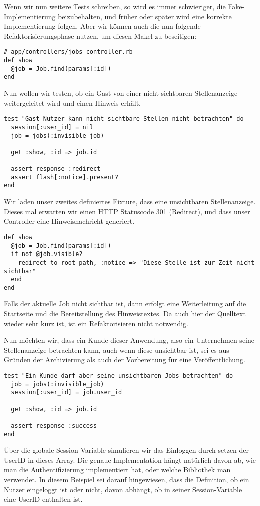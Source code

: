 Wenn wir nun weitere Tests schreiben, so wird es immer schwieriger, die Fake-Implementierung beizubehalten, und früher oder später wird eine korrekte Implementierung folgen. 
Aber wir können auch die nun folgende Refaktorisierungsphase nutzen, um diesen Makel zu beseitigen:
\tddrefactor
\begin{lstlisting}
# app/controllers/jobs_controller.rb
def show
  @job = Job.find(params[:id])
end
\end{lstlisting}

Nun wollen wir testen, ob ein Gast von einer nicht-sichtbaren Stellenanzeige weitergeleitet wird und einen Hinweis erhält.

\begin{lstlisting}
test "Gast Nutzer kann nicht-sichtbare Stellen nicht betrachten" do
  session[:user_id] = nil
  job = jobs(:invisible_job)
  
  get :show, :id => job.id

  assert_response :redirect
  assert flash[:notice].present?
end
\end{lstlisting}
\tddred

Wir laden unser zweites definiertes Fixture, dass eine unsichtbaren Stellenanzeige. Dieses mal erwarten wir einen HTTP Statuscode 301 (Redirect), und dass unser Controller eine Hinweisnachricht generiert.

\begin{lstlisting}
def show
  @job = Job.find(params[:id])
  if not @job.visible?
    redirect_to root_path, :notice => "Diese Stelle ist zur Zeit nicht sichtbar"
  end
end
\end{lstlisting}
\tddgreen
Falls der aktuelle Job nicht sichtbar ist, dann erfolgt eine Weiterleitung auf die Startseite und die Bereitstellung des Hinweistextes.
\tddrefactor
Da auch hier der Quelltext wieder sehr kurz ist, ist ein Refaktorisieren nicht notwendig.

Nun möchten wir, dass ein Kunde dieser Anwendung, also ein Unternehmen seine Stellenanzeige betrachten kann, auch wenn diese unsichtbar ist, sei es aus Gründen der Archivierung als auch der Vorbereitung für eine Veröffentlichung.

\begin{lstlisting}
test "Ein Kunde darf aber seine unsichtbaren Jobs betrachten" do
  job = jobs(:invisible_job)
  session[:user_id] = job.user_id
  
  get :show, :id => job.id

  assert_response :success
end
\end{lstlisting}
\tddred
Über die globale Session Variable simulieren wir das Einloggen durch setzen der UserID in dieses Array. Die genaue Implementation hängt natürlich davon ab, wie man die Authentifizierung implementiert hat, oder welche Bibliothek man verwendet. In diesem Beispiel sei darauf hingewiesen, dass die Definition, ob ein Nutzer eingeloggt ist oder nicht, davon abhängt, ob in seiner Session-Variable eine UserID enthalten ist.

